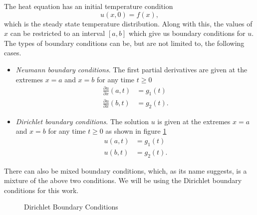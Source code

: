 \documentclass[00main.tex]{subfiles}
\begin{document}
The heat equation has an initial temperature condition \[ u(x,0) =f(x), \] which is the steady state temperature distribution. Along with this, the values of $x$ can be restricted to an interval $[a,b]$ which give us boundary conditions for $u$. The types of boundary conditions can be, but are not limited to, the following cases. \begin{itemize}
\item \emph{Neumann boundary conditions}. The first partial derivatives are given at the extremes $x=a$ and $x=b$ for any time $t \geq 0$ \begin{align*}
\frac{\partial u}{\partial x} (a,t) &= g_1(t)\\
\frac{\partial u}{\partial x} (b,t) &= g_2(t).
\end{align*}
\item \emph{Dirichlet boundary conditions}. The solution $u$ is given at the extremes $x=a$ and $x=b$ for any time $t \geq 0$ as shown in figure \ref{dirichlet} \begin{align*}
u(a,t) &= g_1 (t) \\
u(b,t) &= g_2(t).
\end{align*}
\end{itemize}

There can also be mixed boundary conditions, which, as its name suggests, is a mixture of the above two conditions. We will be using the Dirichlet boundary conditions for this work.

\begin{figure}
\centering
{}
\caption{Dirichlet Boundary Conditions}
\label{dirichlet}
\end{figure}
\end{document}
